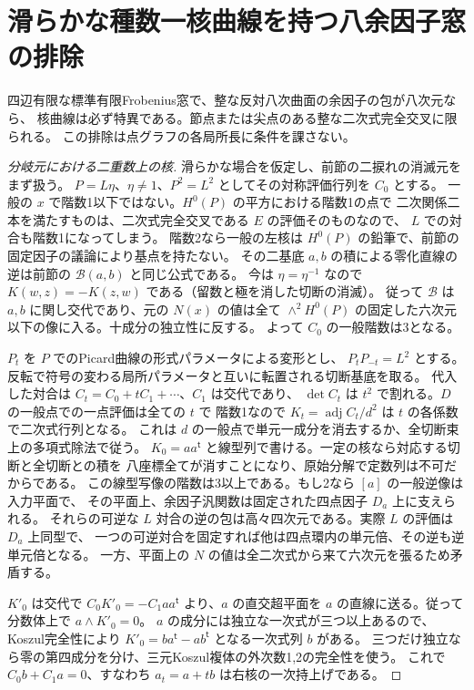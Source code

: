 \section{滑らかな種数一核曲線を持つ八余因子窓の排除}
\label{sec:smooth-elliptic-cofactor-exclusion}
\begin{theorem}\label{thm:smooth-elliptic-cofactor-exclusion}
四辺有限な標準有限Frobenius窓で、整な反対八次曲面の余因子の包が八次元なら、
核曲線は必ず特異である。節点または尖点のある整な二次式完全交叉に限られる。
この排除は点グラフの各局所長に条件を課さない。
\end{theorem}
\begin{proof}[分岐元における二重数上の核]
滑らかな場合を仮定し、前節の二捩れの消滅元をまず扱う。
$P=L\eta$、$\eta\ne1$、$P^2=L^2$ としてその対称評価行列を $C_0$ とする。
一般の $x$ で階数1以下ではない。$H^0(P)$ の平方における階数1の点で
二次関係二本を満たすものは、二次式完全交叉である $E$ の評価そのものなので、
$L$ での対合も階数1になってしまう。
階数2なら一般の左核は $H^0(P)$ の鉛筆で、前節の固定因子の議論により基点を持たない。
その二基底 $a,b$ の積による零化直線の逆は前節の $\mathcal B(a,b)$ と同じ公式である。
今は $\eta=\eta^{-1}$ なので $K(w,z)=-K(z,w)$ である（留数と極を消した切断の消滅）。
従って $\mathcal B$ は $a,b$ に関し交代であり、元の $N(x)$ の値は全て
$\wedge^2 H^0(P)$ の固定した六次元以下の像に入る。十成分の独立性に反する。
よって $C_0$ の一般階数は3となる。

$P_t$ を $P$ でのPicard曲線の形式パラメータによる変形とし、
$P_tP_{-t}=L^2$ とする。反転で符号の変わる局所パラメータと互いに転置される切断基底を取る。
代入した対合は $C_t=C_0+tC_1+\cdots$、$C_1$ は交代であり、
$\det C_t$ は $t^2$ で割れる。$D$ の一般点での一点評価は全ての $t$ で
階数1なので $K_t=\operatorname{adj}C_t/d^2$ は $t$ の各係数で二次式行列となる。
これは $d$ の一般点で単元一成分を消去するか、全切断束上の多項式除法で従う。
$K_0=aa^{\mathsf t}$ と線型列で書ける。一定の核なら対応する切断と全切断との積を
八座標全てが消すことになり、原始分解で定数列は不可だからである。
この線型写像の階数は3以上である。もし2なら $[a]$ の一般逆像は入力平面で、
その平面上、余因子汎関数は固定された四点因子 $D_a$ 上に支えられる。
それらの可逆な $L$ 対合の逆の包は高々四次元である。実際 $L$ の評価は $D_a$ 上同型で、
一つの可逆対合を固定すれば他は四点環内の単元倍、その逆も逆単元倍となる。
一方、平面上の $N$ の値は全二次式から来て六次元を張るため矛盾する。

$K'_0$ は交代で $C_0K'_0=-C_1aa^{\mathsf t}$ より、$a$ の直交超平面を
$a$ の直線に送る。従って分数体上で $a\wedge K'_0=0$。
$a$ の成分には独立な一次式が三つ以上あるので、Koszul完全性により
$K'_0=ba^{\mathsf t}-ab^{\mathsf t}$ となる一次式列 $b$ がある。
三つだけ独立なら零の第四成分を分け、三元Koszul複体の外次数1,2の完全性を使う。
これで $C_0b+C_1a=0$、すなわち $a_t=a+tb$ は右核の一次持上げである。


\end{proof}
